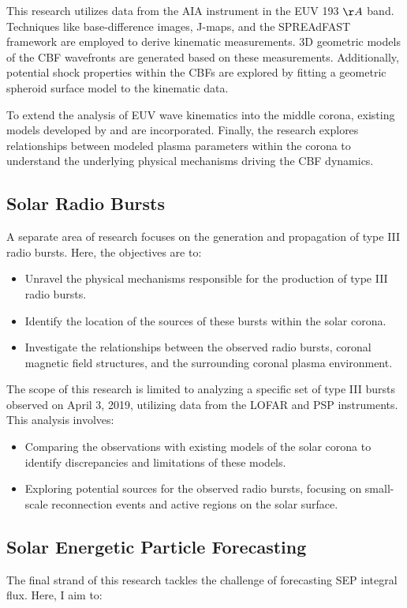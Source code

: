 This research utilizes data from the AIA instrument in the EUV 193 $\AA$ band. Techniques like base-difference images, J-maps, and the SPREAdFAST framework are employed to derive kinematic measurements. 3D geometric models of the CBF wavefronts are generated based on these measurements. Additionally, potential shock properties within the CBFs are explored by fitting a geometric spheroid surface model to the kinematic data. 

To extend the analysis of EUV wave kinematics into the middle corona, existing models developed by \citet{byrne_2013} and \citet{gallagher_2003} are incorporated. Finally, the research explores relationships between modeled plasma parameters within the corona to understand the underlying physical mechanisms driving the CBF dynamics.

\subsection*{Solar Radio Bursts}
A separate area of research focuses on the generation and propagation of type III radio bursts. Here, the objectives are to:

\begin{itemize}
	\item Unravel the physical mechanisms responsible for the production of type III radio bursts.
	\item Identify the location of the sources of these bursts within the solar corona.
	\item Investigate the relationships between the observed radio bursts, coronal magnetic field structures, and the surrounding coronal plasma environment.
\end{itemize}

The scope of this research is limited to analyzing a specific set of type III bursts observed on April 3, 2019, utilizing data from the LOFAR and PSP instruments. This analysis involves:

\begin{itemize}
	\item Comparing the observations with existing models of the solar corona to identify discrepancies and limitations of these models.
	\item Exploring potential sources for the observed radio bursts, focusing on small-scale reconnection events and active regions on the solar surface.
\end{itemize}

\subsection*{Solar Energetic Particle Forecasting}
The final strand of this research tackles the challenge of forecasting SEP integral flux. Here, I aim to:

